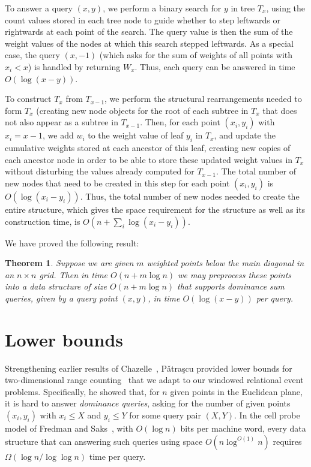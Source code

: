 \documentclass[11pt]{article}
\newtheorem{theorem}{Theorem}
\begin{document}
To answer a query $(x,y)$, we perform a binary search for $y$ in tree $T_x$, using the count values stored in each tree node to guide whether to step leftwards or rightwards at each point of the search. The query value is then the sum of the weight values of the nodes at which this search stepped leftwards. As a special case, the query $(x,-1)$ (which asks for the sum of weights of all points with $x_i<x$) is handled by returning $W_x$. Thus, each query can be answered in time $O(\log(x-y))$.

To construct $T_x$ from $T_{x-1}$, we perform the structural rearrangements needed to form $T_x$ (creating new node objects for the root of each subtree in $T_x$ that does not also appear as a subtree in $T_{x-1}$. Then, for each point $(x_i,y_i)$ with $x_i=x-1$, we add $w_i$ to the weight value of leaf $y_i$ in $T_x$, and update the cumulative weights stored at each ancestor of this leaf, creating new copies of each ancestor node in order to be able to store these updated weight values in $T_x$ without disturbing the values already computed for $T_{x-1}$. The total number of new nodes that need to be created in this step for each point $(x_i,y_i)$ is $O(\log(x_i-y_i))$.
Thus, the total number of new nodes needed to create the entire structure, which gives the space requirement for the structure as well as its construction time, is $O(n+\sum_i \log(x_i-y_i))$.

We have proved the following result:

\begin{theorem}
Suppose we are given $m$ weighted points below the main diagonal in an $n\times n$ grid. Then in time $O(n+m\log n)$ we may preprocess these points into a data structure of size $O(n+m\log n)$ that supports dominance sum queries, given by a query point $(x,y)$, in time $O(\log(x-y))$ per query.
\end{theorem}

\section{Lower bounds}
\label{sec:lb}

Strengthening earlier results of Chazelle~\cite{Cha-JACM-90},
P{\v a}tra{\c s}cu provided lower bounds for two-dimensional range counting~\cite{Pat-STOC-07} that we adapt to our windowed relational event problems. Specifically, he showed that, for $n$ given points in the Euclidean plane, it is hard to answer \emph{dominance queries}, asking for the number of given points $(x_i,y_i)$ with $x_i\le X$ and $y_i\le Y$ for some query pair $(X,Y)$. In the cell probe model of Fredman and Saks~\cite{FreSak-STOC-89}, with $O(\log n)$ bits per machine word, every data structure that can answering such queries using space $O(n\log^{O(1)} n)$ requires $\Omega(\log n/\log\log n)$ time per query.
\end{document}
